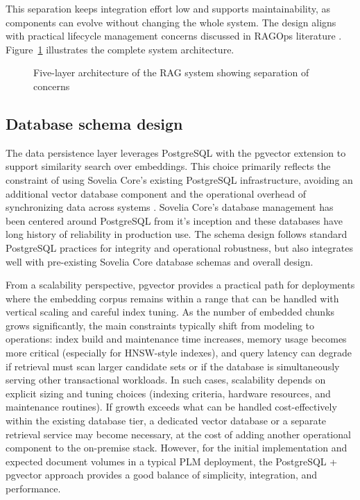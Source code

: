 This separation keeps integration effort low and supports maintainability, as components can evolve without changing the whole system. The design aligns with practical lifecycle management concerns discussed in RAGOps literature \parencite{KimothiAbhinav2025ASGt}. Figure~\ref{fig:system-layers} illustrates the complete system architecture.

\begin{figure}[htbp]
    \centering
    \small{\resizebox{\textwidth}{!}{}}
    \caption{Five-layer architecture of the RAG system showing separation of concerns}
    \label{fig:system-layers}
\end{figure}

\subsection{Database schema design}
\label{subsec:database-schema-design}

The data persistence layer leverages PostgreSQL with the pgvector extension \cite{PgvectorPgvector2025} to support similarity search over embeddings. This choice primarily reflects the constraint of using Sovelia Core's existing PostgreSQL infrastructure, avoiding an additional vector database component and the operational overhead of synchronizing data across systems \parencite{herediaalvaroAdvancedRetrievalaugmentedGeneration2025, shejutiExtendedAbstractEnhancing2025, taipalusVectorDatabaseManagement2024}. Sovelia Core's database management has been centered around PostgreSQL from it's inception and these databases have long history of reliability in production use. The schema design follows standard PostgreSQL practices for integrity and operational robustness, but also integrates well with pre-existing Sovelia Core database schemas and overall design.

From a scalability perspective, pgvector provides a practical path for deployments where the embedding corpus remains within a range that can be handled with vertical scaling and careful index tuning. As the number of embedded chunks grows significantly, the main constraints typically shift from modeling to operations: index build and maintenance time increases, memory usage becomes more critical (especially for HNSW-style indexes), and query latency can degrade if retrieval must scan larger candidate sets or if the database is simultaneously serving other transactional workloads. In such cases, scalability depends on explicit sizing and tuning choices (indexing criteria, hardware resources, and maintenance routines). If growth exceeds what can be handled cost-effectively within the existing database tier, a dedicated vector database or a separate retrieval service may become necessary, at the cost of adding another operational component to the on-premise stack. However, for the initial implementation and expected document volumes in a typical PLM deployment, the PostgreSQL + pgvector approach provides a good balance of simplicity, integration, and performance.

